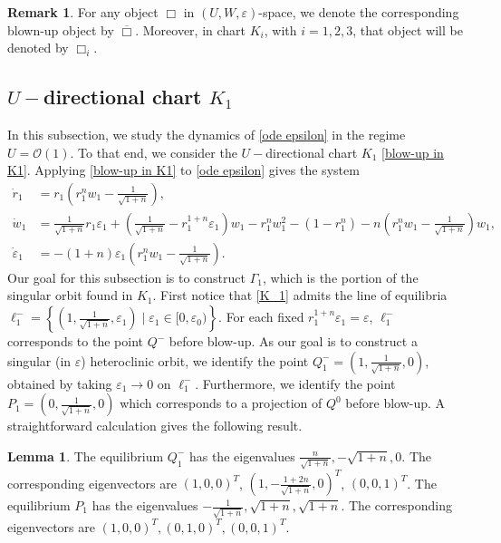 \documentclass{article}
\theoremstyle{definition}
\numberwithin{equation}{section}
\newtheorem{lem}[prop]{Lemma}
\newtheorem{remark}[prop]{Remark}
\begin{document}
\begin{remark}
For any object $\Box$ in $(U,W,\varepsilon)$-space, we denote the corresponding blown-up object by $\overline{\Box}$. Moreover, in chart $K_i$, with $i=1,2,3$, that object will be denoted by $\Box_i$.
\end{remark}


\subsection{$U-$directional chart $K_1$}
In this subsection, we study the dynamics of \eqref{ode epsilon} in the regime $U=\mathcal{O}(1)$. To that end, we consider the $U-$directional chart $K_1$ \eqref{blow-up in K1}. 
Applying \eqref{blow-up in K1} to \eqref{ode epsilon} gives the system 
\begin{equation}
    \begin{aligned}
        \dot{r}_1&=r_1\left(r_1^nw_1-\tfrac{1}{\sqrt{1+n}}\right),\\
        \dot{w}_1&=\tfrac{1}{\sqrt{1+n}}r_1\varepsilon_1+\left(\tfrac{1}{\sqrt{1+n}}-r_1^{1+n}\varepsilon_1\right)w_1-r_1^nw_1^2-(1-r_1^n)-n\left(r_1^nw_1-\tfrac{1}{\sqrt{1+n}}\right)w_1,\\
        \dot{\varepsilon}_1&=-(1+n)\varepsilon_1\left(r_1^nw_1-\tfrac{1}{\sqrt{1+n}}\right).
        \label{K_1}
    \end{aligned}
\end{equation}
Our goal for this subsection is to construct $\Gamma_1$, which is the portion of the singular orbit found in $K_1$.
First notice that \eqref{K_1} admits the line of equilibria  $\ell_1^-=\left\{\left(1, \tfrac{1}{\sqrt{1+n}}, \varepsilon_1\right)\;\bigg|\;\varepsilon_1\in[0, \varepsilon_0)\right\}$. For each fixed $r_1^{1+n}\varepsilon_1=\varepsilon$, $\ell_1^-$ corresponds to the point $Q^-$ before blow-up. As our goal is to construct a singular (in $\varepsilon$) heteroclinic orbit, we identify the point $Q_1^-=\left(1, \tfrac{1}{\sqrt{1+n}}, 0\right)$, obtained by taking $\varepsilon_1\to0$ on $\ell_1^-$. Furthermore, we identify the point $P_1=\left(0,\tfrac{1}{\sqrt{1+n}} ,0\right)$ which corresponds to a projection of $Q^0$ before blow-up. A straightforward calculation gives the following result.
\begin{lem} 
    The equilibrium $Q_1^-$ has the eigenvalues $\tfrac{n}{\sqrt{1+n}}, -\sqrt{1+n}, 0$. The corresponding eigenvectors are $(1,0,0)^T$, $\left(1,-\tfrac{1+2n}{\sqrt{1+n}},0\right)^T$, $(0,0,1)^T$.
    The equilibrium $P_1$ has the eigenvalues $-\tfrac{1}{\sqrt{1+n}}, \sqrt{1+n}, \sqrt{1+n}$. The corresponding eigenvectors are $(1,0,0)^T,(0,1,0)^T, (0,0,1)^T$.
\end{lem}
\end{document}
